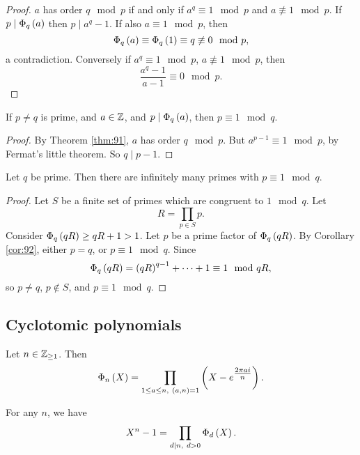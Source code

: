\begin{proof}
$ a $ has order $ q \mod p $ if and only if $ a^q \equiv 1 \mod p $ and $ a \not\equiv 1 \mod p $. If $ p \mid \Phi_q\left( a \right) $ then $ p \mid a^q - 1 $. If also $ a \equiv 1 \mod p $, then
$$ \Phi_q\left( a \right) \equiv \Phi_q\left( 1 \right) \equiv q \not\equiv 0 \mod p, $$
a contradiction. Conversely if $ a^q \equiv 1 \mod p $, $ a \not\equiv 1 \mod p $, then
$$ \dfrac{a^q - 1}{a - 1} \equiv 0 \mod p. $$
\end{proof}


\begin{corollary}
\label{cor:92}
If $ p \ne q $ is prime, and $ a \in \mathbb{Z} $, and $ p \mid \Phi_q\left( a \right) $, then $ p \equiv 1 \mod q $.
\end{corollary}

\begin{proof}
By Theorem \ref{thm:91}, $ a $ has order $ q \mod p $. But $ a^{p - 1} \equiv 1 \mod p $, by Fermat's little theorem. So $ q \mid p - 1 $.
\end{proof}

\begin{theorem}
Let $ q $ be prime. Then there are infinitely many primes with $ p \equiv 1 \mod q $.
\end{theorem}

\begin{proof}
Let $ S $ be a finite set of primes which are congruent to $ 1 \mod q $. Let
$$ R = \prod_{p \in S} p. $$
Consider $ \Phi_q\left( qR \right) \ge qR + 1 > 1 $. Let $ p $ be a prime factor of $ \Phi_q\left( qR \right) $. By Corollary \ref{cor:92}, either $ p = q $, or $ p \equiv 1 \mod q $. Since
$$ \Phi_q\left( qR \right) = \left( qR \right)^{q - 1} + \dots + 1 \equiv 1 \mod qR, $$
so $ p \ne q $, $ p \notin S $, and $ p \equiv 1 \mod q $.
\end{proof}

\subsection{Cyclotomic polynomials}

\begin{definition}
Let $ n \in \mathbb{Z}_{\ge 1} $. Then
$$ \Phi_n\left( X \right) = \prod_{1 \le a \le n, \ \left( a, n \right) = 1} \left( X - e^{\tfrac{2\pi ai}{n}} \right). $$
\end{definition}

\begin{lemma}
\label{lem:95}
For any $ n $, we have
$$ X^n - 1 = \prod_{d \mid n, \ d > 0} \Phi_d\left( X \right). $$
\end{lemma}

